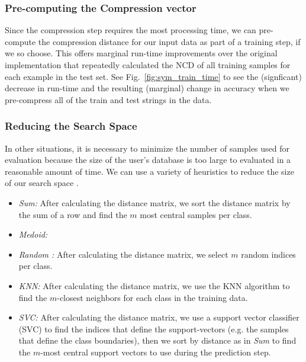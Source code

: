 \documentclass[conference]{IEEEtran}
\begin{document}
\subsubsection{Pre-computing the Compression vector}
Since the compression step requires the most processing time, we can pre-compute the compression distance for our input data as part of a training step, if we so choose. This offers marginal run-time improvements over the original implementation that repeatedly calculated the NCD of all training samples for each example in the test set. 
See Fig.~\ref{fig:sym_train_time} to see the (signficant) decrease in run-time  and the resulting (marginal) change in accuracy when we pre-compress all of the train and test strings in the data. %










\subsubsection{Reducing the Search Space}
\label{best-samples}
In other situations, it is necessary to minimize the number of samples used for evaluation because the size of the user's database is too large to evaluated in a reasonable amount of time. We can use a variety of heuristics to reduce the size of our search space \cite{amal2011survey}. 
\begin{itemize}
    \item \textit{Sum:} After calculating the distance matrix, we sort the distance matrix by the sum of a row and find the $m$ most central samples per class.
    \item \textit{Medoid: }
    \item \textit{Random : } After calculating the distance matrix, we select $m$ random indices per class.
    \item \textit{KNN: } After calculating the distance matrix, we use the KNN algorithm to find the $m$-closest neighbors for each class in the training data.
    \item \textit{SVC: } After calculating the distance matrix, we use a support vector classifier (SVC) to find the indices that define the support-vectors (e.g. the samples that define the class boundaries), then we sort by distance as in \textit{Sum} to find the $m$-most central support vectors to use during the prediction step.
\end{itemize}
\end{document}
